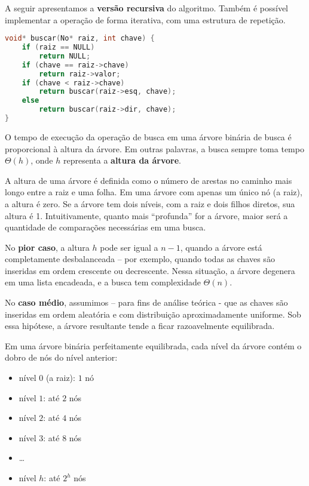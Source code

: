 A seguir apresentamos a \textbf{versão recursiva} do algoritmo. 
Também é possível implementar a operação de forma iterativa, com uma estrutura de repetição.

\begin{lstlisting}[language=C, caption={Busca recursiva em ABB}]
void* buscar(No* raiz, int chave) {
    if (raiz == NULL)
        return NULL;
    if (chave == raiz->chave)
        return raiz->valor;
    if (chave < raiz->chave)
        return buscar(raiz->esq, chave);
    else
        return buscar(raiz->dir, chave);
}
\end{lstlisting}


O tempo de execução da operação de busca em uma árvore binária de busca é proporcional à altura da árvore. 
Em outras palavras, a busca sempre toma tempo $\Theta(h)$, onde $h$ representa a \textbf{altura da árvore}.

A altura de uma árvore é definida como o número de arestas no caminho mais longo entre a raiz e uma folha. 
Em uma árvore com apenas um único nó (a raiz), a altura é zero. 
Se a árvore tem dois níveis, com a raiz e dois filhos diretos, sua altura é 1. 
Intuitivamente, quanto mais ``profunda'' for a árvore, maior será a quantidade de comparações necessárias em uma busca.

No \textbf{pior caso}, a altura $h$ pode ser igual a $n - 1$, quando a árvore está completamente desbalanceada -- por exemplo, quando todas as chaves são inseridas em ordem crescente ou decrescente. 
Nessa situação, a árvore degenera em uma lista encadeada, e a busca tem complexidade $\Theta(n)$.

No \textbf{caso médio}, assumimos -- para fins de análise teórica - que as chaves são inseridas em ordem aleatória e com distribuição aproximadamente uniforme. 
Sob essa hipótese, a árvore resultante tende a ficar razoavelmente equilibrada.

Em uma árvore binária perfeitamente equilibrada, cada nível da árvore contém o dobro de nós do nível anterior:
\begin{itemize}
  \item nível $0$ (a raiz): $1$ nó
  \item nível $1$: até $2$ nós
  \item nível $2$: até $4$ nós
  \item nível $3$: até $8$ nós
  \item \dots
  \item nível $h$: até $2^h$ nós
\end{itemize}

